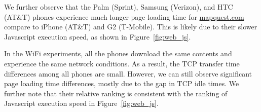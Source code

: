 

We further observe that the Palm (Sprint), Samsung (Verizon), and 
HTC (AT\&T) phones experience much longer page loading time for
\url{mapquest.com} compare to iPhone (AT\&T) and G2 (T-Mobile). 
This is likely due to their slower Javascript execution speed,
as shown in Figure~\ref{fig:web_js}. 


In the WiFi experiments, all the phones download the same contents and 
experience the same network conditions. As a result, the TCP transfer
time differences among all phones are small. However, we can still 
observe significant page loading time differences, mostly due to the
gap in TCP idle times. We further note that their relative ranking is 
consistent with the ranking of Javascript execution speed in 
Figure~\ref{fig:web_js}.


